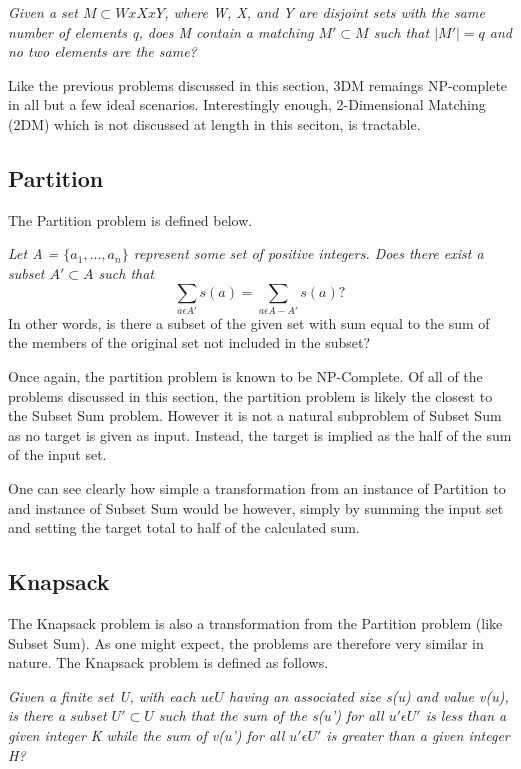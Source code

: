 \documentclass{article}
\begin{document}
\textit{Given a set $M \subset WxXxY$, where W, X, and Y are disjoint sets with the same number of elements q, does M contain a matching $M' \subset M$ such that $|M'|= q$ and no two elements are the same?}

Like the previous problems discussed in this section, 3DM remaings NP-complete in all but a few ideal scenarios.
Interestingly enough, 2-Dimensional Matching (2DM) which is not discussed at length in this seciton, is tractable.

\subsection{Partition} 

The Partition problem is defined below.

\textit{Let A = $\{a_1, ..., a_n\}$ represent some set of positive integers. Does there exist a subset $A' \subset A$ such that
  $$\sum_{a \epsilon A'} s(a) = \sum_{a \epsilon A - A'} s(a)?$$}
In other words, is there a subset of the given set with sum equal to the sum of the members of the original set not included in the subset?

Once again, the partition problem is known to be NP-Complete. Of all of the problems discussed in this section,
the partition problem is likely the closest to the Subset Sum problem. However it is not a natural subproblem of Subset Sum
as no target is given as input. Instead, the target is implied as the half of the sum of the input set.

One can see clearly how simple a transformation from an instance of Partition to and instance of Subset Sum would be however, simply
by summing the input set and setting the target total to half of the calculated sum.

\subsection{Knapsack}

The Knapsack problem is also a transformation from the Partition problem (like Subset Sum). As one might expect, the problems are
therefore very similar in nature. The Knapsack problem is defined as follows.

\textit{Given a finite set U, with each $u \epsilon U$ having an associated size s(u) and value v(u), is there a subset $U' \subset U$ such that the sum of the s(u') for all $u' \epsilon U'$ is less than a given integer K while the sum of v(u') for all  $u' \epsilon U'$ is greater than a given integer H?}
\end{document}
